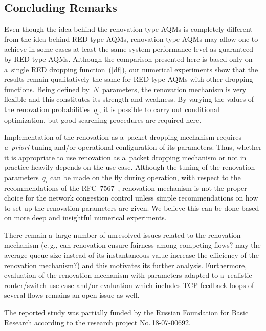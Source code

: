 \begin{multicols}{2}
\vspace*{-6pt}

\section{Concluding Remarks}

\noindent
Even though the idea behind the renovation-type AQMs is completely 
different from the idea behind RED-type AQMs, 
renovation-type AQMs may allow one to achieve in some cases at least 
the same system performance level as guaranteed by RED-type AQMs. 
Although the comparison presented here is based only on a~single RED dropping 
function~(\ref{df}), 
our numerical experiments show that the results remain 
qualitatively the same for RED-type AQMs with other dropping functions.
Being defined by~$N$~parameters, the renovation mechanism is very flexible
and this constitutes its strength and weakness.
By varying the values of the renovation probabilities~$q_i$,
it is possible to carry out conditional optimization,
but good searching procedures are required here.

Implementation of the renovation as a~packet dropping mechanism
requires \textit{a~priori} tuning and/or operational configuration of its parameters.
Thus, whether it is appropriate to use renovation as a~packet dropping mechanism 
or not in practice heavily depends on the use case.
Although the tuning of the renovation parameters~$q_i$ can be made on the 
fly during operation, with respect to the recommendations of the RFC~7567~\cite{RFC7567},
renovation mechanism is not the proper choice for the network congestion control 
unless simple recommendations on how to set up the renovation parameters are given.
We believe this can be done based on more deep and insightful numerical experiments.

There remain a~large number of unresolved issues 
related to the renovation mechanism 
(e.\,g., can renovation ensure fairness among competing flows?
may the average queue size instead of its instantaneous value
increase the efficiency of the renovation mechanism?)
and this motivates its further analysis. 
Furthermore, evaluation of the renovation mechanism with parameters 
adapted to a~realistic router/switch use case
and/or evaluation which includes TCP feedback loops 
of several flows remains an open issue as well.

\vspace*{-6pt}


\Ack
  \noindent
   The reported study was partially funded by the Russian Foundation for 
Basic Research according to the research project No.\,18-07-00692.


\end{multicols}
